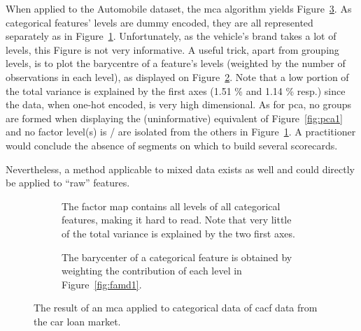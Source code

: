 When applied to the Automobile dataset, the \gls{mca} algorithm yields Figure~\ref{fig:mca}. As categorical features' levels are dummy encoded, they are all represented separately as in Figure~\ref{fig:mca1}. Unfortunately, as the vehicle's brand takes a lot of levels, this Figure is not very informative. A useful trick, apart from grouping levels, is to plot the barycentre of a feature's levels (weighted by the number of observations in each level), as displayed on Figure~\ref{fig:mca2}. Note that a low portion of the total variance is explained by the first axes (1.51 \% and 1.14 \% resp.) since the data, when one-hot encoded, is very high dimensional. As for \gls{pca}, no groups are formed when displaying the (uninformative) equivalent of Figure~\ref{fig:pca1} and no factor level(s) is / are isolated from the others in Figure~\ref{fig:mca1}. A practitioner would conclude the absence of segments on which to build several scorecards.

Nevertheless, a method applicable to mixed data exists as well and could directly be applied to ``raw'' features.

\begin{figure}[!htb]
{\setlength{\parindent}{0cm}}

\begin{multicols}{2}
\centering
\begin{subfigure}[t]{0.45\textwidth}
\centering
\resizebox{\textwidth}{!}{}
\caption{\label{fig:mca1} The factor map contains all levels of all categorical features, making it hard to read. Note that very little of the total variance is explained by the two first axes.}
\end{subfigure}%
\columnbreak
\hspace*{1cm} \begin{subfigure}[t]{0.45\textwidth}
\centering
\resizebox{\textwidth}{!}{}
\caption{\label{fig:mca2} The barycenter of a categorical feature is obtained by weighting the contribution of each level in Figure~\ref{fig:famd1}.}
\end{subfigure}
\end{multicols}

\caption{\label{fig:mca} The result of an \gls{mca} applied to categorical data of \gls{cacf} data from the car loan market.}
\end{figure}

\paragraph{}

